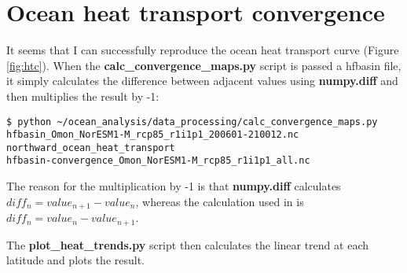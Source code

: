 \section{Ocean heat transport convergence}

It seems that I can successfully reproduce the ocean heat transport curve (Figure \ref{fig:htc}). When the \textbf{calc_convergence_maps.py} script is passed a hfbasin file, it simply calculates the difference between adjacent values using \textbf{numpy.diff} and then multiplies the result by -1:

\begin{verbatim}
$ python ~/ocean_analysis/data_processing/calc_convergence_maps.py
hfbasin_Omon_NorESM1-M_rcp85_r1i1p1_200601-210012.nc
northward_ocean_heat_transport
hfbasin-convergence_Omon_NorESM1-M_rcp85_r1i1p1_all.nc
\end{verbatim}

The reason for the multiplication by -1 is that \textbf{numpy.diff} calculates $diff_{n} = value_{n+1} - value_{n}$, whereas the calculation used in \citet{Nummelin_2017} is $diff_{n} = value_{n} - value_{n+1}$.    

The \textbf{plot_heat_trends.py} script then calculates the linear trend at each latitude and plots the result. 